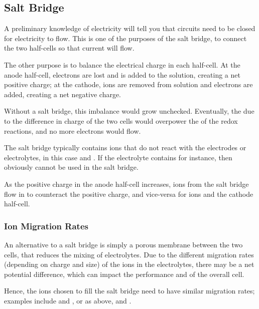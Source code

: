 

		\subsection{Salt Bridge}

			A preliminary knowledge of electricity will tell you that circuits need to be closed for electricity to flow. This is one of the
			purposes of the salt bridge, to connect the two half-cells so that current will flow.

			The other purpose is to balance the electrical charge in each half-cell. At the anode half-cell, electrons are lost and
			 is added to the solution, creating a net positive charge; at the cathode,  ions are removed from solution
			and electrons are added, creating a net negative charge.

			Without a salt bridge, this imbalance would grow unchecked. Eventually, the  due to the difference in
			charge of the two cells would overpower the \Ecell{} of the redox reactions, and no more electrons would flow.

			The salt bridge typically contains ions that do not react with the electrodes or electrolytes, in this case  and \ch{\Cl-}. If the
			electrolyte contains  for instance, then obviously \ch{\Cl-} cannot be used in the salt bridge.

			As the positive charge in the anode half-cell increases, \ch{\Cl-} ions from the salt bridge flow in to counteract the positive charge,
			and vice-versa for  ions and the cathode half-cell.


			\subsubsection{Ion Migration Rates}

				An alternative to a salt bridge is simply a porous membrane between the two cells, that reduces the mixing of electrolytes.
				Due to the different migration rates (depending on charge and size) of the ions in the electrolytes, there may be a net potential
				difference, which can impact the performance and \Ecell{} of the overall cell.

				Hence, the ions chosen to fill the salt bridge need to have similar migration rates; examples include  and , or
				as above,  and \ch{\Cl-}.


